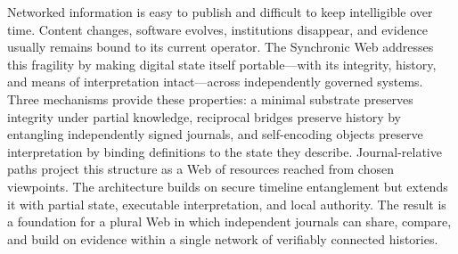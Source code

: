 Networked information is easy to publish and difficult to keep intelligible over time. Content changes, software evolves, institutions disappear, and evidence usually remains bound to its current operator. The Synchronic Web addresses this fragility by making digital state itself portable---with its integrity, history, and means of interpretation intact---across independently governed systems. Three mechanisms provide these properties: a minimal substrate preserves integrity under partial knowledge, reciprocal bridges preserve history by entangling independently signed journals, and self-encoding objects preserve interpretation by binding definitions to the state they describe. Journal-relative paths project this structure as a Web of resources reached from chosen viewpoints. The architecture builds on secure timeline entanglement but extends it with partial state, executable interpretation, and local authority. The result is a foundation for a plural Web in which independent journals can share, compare, and build on evidence within a single network of verifiably connected histories.